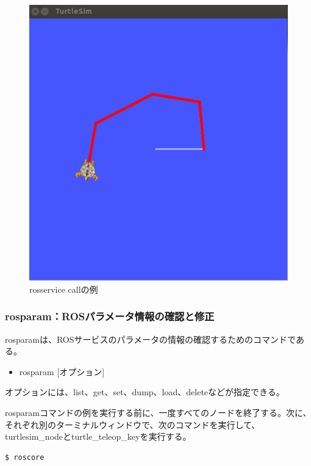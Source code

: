 \begin{figure}[htp]
  \centering
  \includegraphics[width=\columnwidth]{pictures/chapter4/pic_04_03.png}
  \caption{rosservice callの例}
\end{figure}

\subsubsection{rosparam：ROSパラメータ情報の確認と修正}

rosparamは、ROSサービスのパラメータの情報の確認するためのコマンドである。

\begin{itemize}
\item rosparam [オプション]
\end{itemize}

オプションには、list、get、set、dump、load、deleteなどが指定できる。

rosparamコマンドの例を実行する前に、一度すべてのノードを終了する。次に、それぞれ別のターミナルウィンドウで、次のコマンドを実行して、turtlesim\_nodeとturtle\_teleop\_keyを実行する。

\begin{lstlisting}[language=ROS]
$ roscore
\end{lstlisting}

